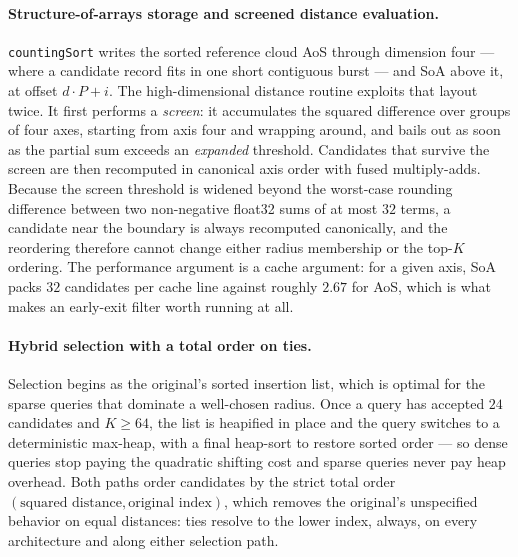 \documentclass[11pt]{article}
\begin{document}
\paragraph{Structure-of-arrays storage and screened distance evaluation.}
\texttt{countingSort} writes the sorted reference cloud AoS through dimension
four --- where a candidate record fits in one short contiguous burst --- and SoA
above it, at offset $d \cdot P + i$. The high-dimensional distance routine
exploits that layout twice. It first performs a \emph{screen}: it accumulates
the squared difference over groups of four axes, starting from axis four and
wrapping around, and bails out as soon as the partial sum exceeds an
\emph{expanded} threshold. Candidates that survive the screen are then
recomputed in canonical axis order with fused multiply-adds. Because the screen
threshold is widened beyond the worst-case rounding difference between two
non-negative float32 sums of at most $32$ terms, a candidate near the boundary is
always recomputed canonically, and the reordering therefore cannot change either
radius membership or the top-$K$ ordering. The performance argument is a cache
argument: for a given axis, SoA packs $32$ candidates per cache line against
roughly $2.67$ for AoS, which is what makes an early-exit filter worth running
at all.

\paragraph{Hybrid selection with a total order on ties.}
Selection begins as the original's sorted insertion list, which is optimal for
the sparse queries that dominate a well-chosen radius. Once a query has accepted
$24$ candidates and $K \ge 64$, the list is heapified in place and the query
switches to a deterministic max-heap, with a final heap-sort to restore sorted
order --- so dense queries stop paying the quadratic shifting cost and sparse
queries never pay heap overhead. Both paths order candidates by the strict total
order $(\text{squared distance}, \text{original index})$, which removes the
original's unspecified behavior on equal distances: ties resolve to the lower
index, always, on every architecture and along either selection path.
\end{document}
